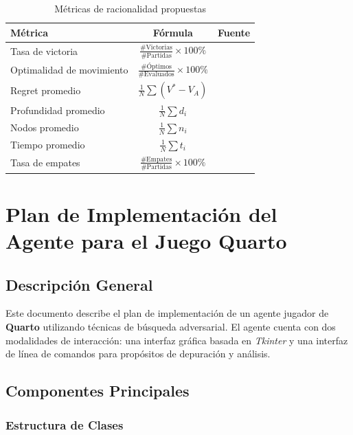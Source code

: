 \documentclass[conference]{IEEEtran}
\begin{document}
\begin{table}[h]
	\centering
	\caption{Métricas de racionalidad propuestas}
	\begin{tabular}{|l|c|c|}
		\hline
		\textbf{Métrica} & \textbf{Fórmula} & \textbf{Fuente} \\
		\hline
		Tasa de victoria & $\frac{\#\text{Victorias}}{\#\text{Partidas}} \times 100\%$ & \cite{herik2002games} \\
		Optimalidad de movimiento & $\frac{\#\text{Óptimos}}{\#\text{Evaluados}} \times 100\%$ & \cite{schaeffer1997chinook} \\
		Regret promedio & $\frac{1}{N} \sum(V^* - V_A)$ & \cite{savage1954foundations} \\
		Profundidad promedio & $\frac{1}{N} \sum d_i$ & \cite{russell2016artificial} \\
		Nodos promedio & $\frac{1}{N} \sum n_i$ & \cite{russell2016artificial} \\
		Tiempo promedio & $\frac{1}{N} \sum t_i$ & \cite{campbell2002deep} \\
		Tasa de empates & $\frac{\#\text{Empates}}{\#\text{Partidas}} \times 100\%$ & \cite{silver2016mastering} \\
		\hline
	\end{tabular}
\end{table}



\section{Plan de Implementación del Agente para el Juego Quarto}

\subsection{Descripción General}

Este documento describe el plan de implementación de un agente jugador de \textbf{Quarto} utilizando técnicas de búsqueda adversarial. El agente cuenta con dos modalidades de interacción: una interfaz gráfica basada en \textit{Tkinter} y una interfaz de línea de comandos para propósitos de depuración y análisis.

\subsection{Componentes Principales}

\subsubsection{Estructura de Clases}
\end{document}
